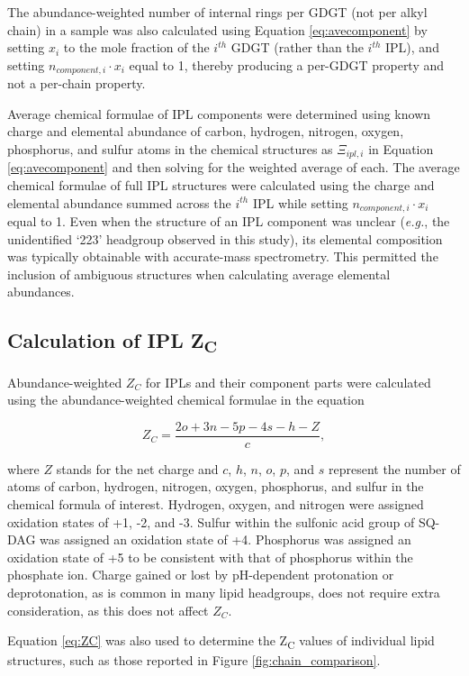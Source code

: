 The abundance-weighted number of internal rings per GDGT (not per alkyl chain) in a sample was also calculated using Equation \ref{eq:avecomponent} by setting $x_{i}$ to the mole fraction of the $i^{th}$ GDGT (rather than the $i^{th}$ IPL), and setting $n_{component,i} \cdot x_{i}$ equal to 1, thereby producing a per-GDGT property and not a per-chain property.

Average chemical formulae of IPL components were determined using known charge and elemental abundance of carbon, hydrogen, nitrogen, oxygen, phosphorus, and sulfur atoms in the chemical structures as $\Xi_{ipl,i}$ in Equation \ref{eq:avecomponent} and then solving for the weighted average of each. The average chemical formulae of full IPL structures were calculated using the charge and elemental abundance summed across the $i^{th}$ IPL while setting $n_{component,i} \cdot x_{i}$ equal to 1. Even when the structure of an IPL component was unclear (\textit{e.g.}, the unidentified `223' headgroup observed in this study), its elemental composition was typically obtainable with accurate-mass spectrometry. This permitted the inclusion of ambiguous structures when calculating average elemental abundances.

\subsection{Calculation of IPL Z\textsubscript{C}}
Abundance-weighted $Z_{C}$ for IPLs and their component parts were calculated using the abundance-weighted chemical formulae in the equation

\begin{equation} \label{eq:ZC}
{Z}_{C} = \frac{2o + 3n - 5p - 4s - h - Z}{c},
\end{equation}

\noindent where $Z$ stands for the net charge and $c$, $h$, $n$, $o$, $p$, and $s$ represent the number of atoms of carbon, hydrogen, nitrogen, oxygen, phosphorus, and sulfur in the chemical formula of interest. Hydrogen, oxygen, and nitrogen were assigned oxidation states of +1, -2, and -3. Sulfur within the sulfonic acid group of SQ-DAG was assigned an oxidation state of +4. Phosphorus was assigned an oxidation state of +5 to be consistent with that of phosphorus within the phosphate ion. Charge gained or lost by pH-dependent protonation or deprotonation, as is common in many lipid headgroups, does not require extra consideration, as this does not affect $Z_{C}$.

Equation \ref{eq:ZC} was also used to determine the Z\textsubscript{C} values of individual lipid structures, such as those reported in Figure \ref{fig:chain_comparison}.


